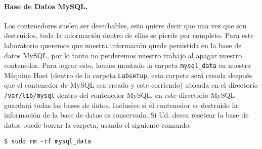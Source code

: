 
\paragraph{Base de Datos MySQL.}

Los contenedores suelen ser desechables, esto quiere decir que una vez que son destruidos, toda la información dentro de ellos se pierde por completo.
Para este laboratorio queremos que nuestra información quede persistida en la base de datos MySQL, por lo tanto no perderemos nuestro trabajo al apagar nuestro contenedor. Para lograr esto, hemos montado la carpeta \texttt{mysql\_data} en nuestra Máquina Host (dentro de la carpeta \texttt{Labsetup}, esta carpeta será creada después que el contenedor de MySQL sea creado y este corriendo) ubicada en el directorio \texttt{/var/lib/mysql} dentro del contenedor MySQL, en este directorio MySQL guardará todas las bases de datos.
Inclusive si el contenedor es destruido la información de la base de datos es conservada.
Si Ud. desea resetear la base de datos puede borrar la carpeta, usando el siguiente comando;
\begin{lstlisting}
$ sudo rm -rf mysql_data
\end{lstlisting}

